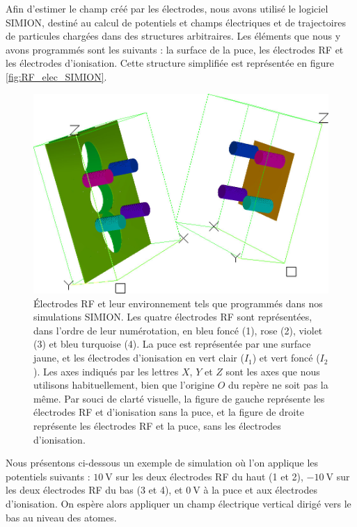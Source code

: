 Afin d'estimer le champ créé par les électrodes, nous avons utilisé le logiciel SIMION, destiné au calcul de potentiels et champs électriques et de trajectoires de particules chargées dans des structures arbitraires.
Les éléments que nous y avons programmés sont les suivants : la surface de la puce, les électrodes RF et les électrodes d'ionisation.
Cette structure simplifiée est représentée en figure \eqref{fig:RF_elec_SIMION}.
%
\begin{figure}[!h]
\centering
\includegraphics[width=\linewidth]{figures/setup/rydberg/RF_electrodes_Simion}
\caption[Électrodes de circularisation et de contrôle du champ parallèle]{
Électrodes \og RF \fg{} et leur environnement tels que programmés dans nos simulations SIMION.
Les quatre électrodes RF sont représentées, dans l'ordre de leur numérotation, en bleu foncé (1), rose (2), violet (3) et bleu turquoise (4).
La puce est représentée par une surface jaune, et les électrodes d'ionisation en vert clair ($I_1$) et vert foncé ($I_2$).
Les axes indiqués par les lettres $X$, $Y$ et $Z$ sont les axes que nous utilisons habituellement, bien que l'origine $O$ du repère ne soit pas la même.
Par souci de clarté visuelle, la figure de gauche représente les électrodes RF et d'ionisation sans la puce, et la figure de droite représente les électrodes RF et la puce, sans les électrodes d'ionisation.
}
\label{fig:RF_elec_SIMION}
\end{figure}
%

Nous présentons ci-dessous un exemple de simulation où l'on applique les potentiels suivants :
$\SI{+10}{\V}$ sur les deux électrodes RF du haut (1 et 2), $\SI{-10}{\V}$ sur les deux électrodes RF du bas (3 et 4), et $\SI{0}{\V}$ à la puce et aux électrodes d'ionisation.
On espère alors appliquer un champ électrique vertical dirigé vers le bas au niveau des atomes.

